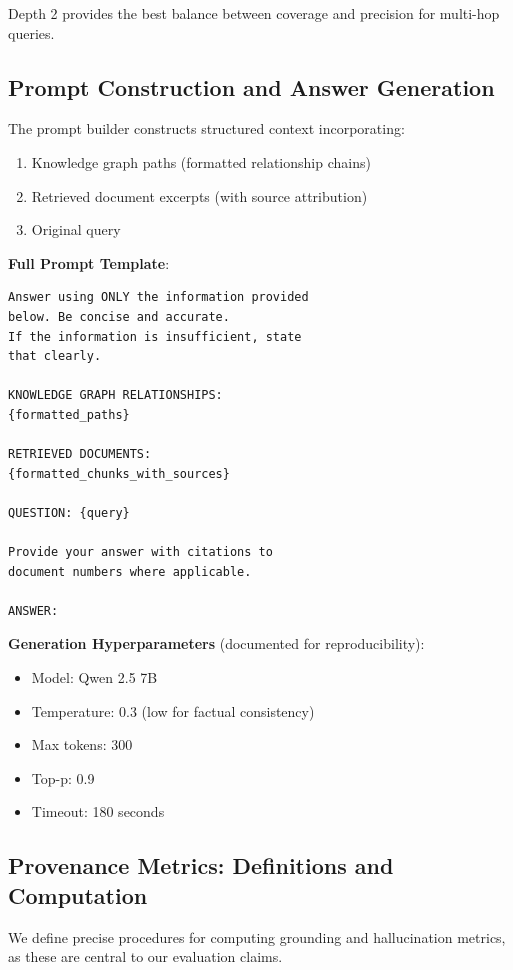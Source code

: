 \documentclass[conference]{IEEEtran}
\begin{document}
Depth 2 provides the best balance between coverage and precision for multi-hop queries.

\subsection{Prompt Construction and Answer Generation}

The prompt builder constructs structured context incorporating:
\begin{enumerate}
    \item Knowledge graph paths (formatted relationship chains)
    \item Retrieved document excerpts (with source attribution)
    \item Original query
\end{enumerate}

\textbf{Full Prompt Template}:

\begin{verbatim}
Answer using ONLY the information provided 
below. Be concise and accurate.
If the information is insufficient, state 
that clearly.

KNOWLEDGE GRAPH RELATIONSHIPS:
{formatted_paths}

RETRIEVED DOCUMENTS:
{formatted_chunks_with_sources}

QUESTION: {query}

Provide your answer with citations to 
document numbers where applicable.

ANSWER:
\end{verbatim}

\textbf{Generation Hyperparameters} (documented for reproducibility):
\begin{itemize}
    \item Model: Qwen 2.5 7B
    \item Temperature: 0.3 (low for factual consistency)
    \item Max tokens: 300
    \item Top-p: 0.9
    \item Timeout: 180 seconds
\end{itemize}

\subsection{Provenance Metrics: Definitions and Computation}

We define precise procedures for computing grounding and hallucination metrics, as these are central to our evaluation claims.
\end{document}
